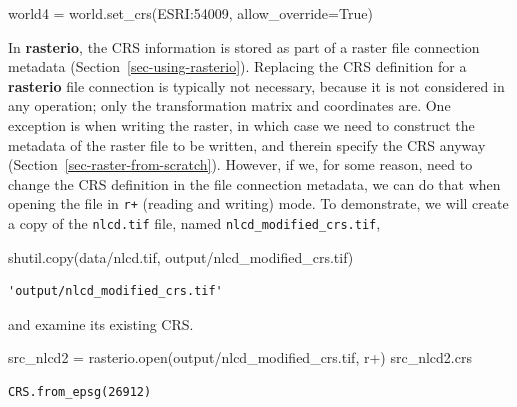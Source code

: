 \documentclass[
  letterpaper,
]{krantz}
\newenvironment{Shaded}{\begin{snugshade}}{\end{snugshade}}
\newcommand{\BuiltInTok}[1]{\textcolor[rgb]{0.00,0.23,0.31}{#1}}
\newcommand{\NormalTok}[1]{\textcolor[rgb]{0.00,0.23,0.31}{#1}}
\newcommand{\OperatorTok}[1]{\textcolor[rgb]{0.37,0.37,0.37}{#1}}
\newcommand{\StringTok}[1]{\textcolor[rgb]{0.13,0.47,0.30}{#1}}
\newcommand{\VariableTok}[1]{\textcolor[rgb]{0.07,0.07,0.07}{#1}}
\begin{document}
\begin{Shaded}
\begin{Highlighting}[]
\NormalTok{world4 }\OperatorTok{=}\NormalTok{ world.set\_crs(}\StringTok{\textquotesingle{}ESRI:54009\textquotesingle{}}\NormalTok{, allow\_override}\OperatorTok{=}\VariableTok{True}\NormalTok{)}
\end{Highlighting}
\end{Shaded}

In \textbf{rasterio}, the CRS information is stored as part of a raster
file connection metadata (Section~\ref{sec-using-rasterio}). Replacing
the CRS definition for a \textbf{rasterio} file connection is typically
not necessary, because it is not considered in any operation; only the
transformation matrix and coordinates are. One exception is when writing
the raster, in which case we need to construct the metadata of the
raster file to be written, and therein specify the CRS anyway
(Section~\ref{sec-raster-from-scratch}). However, if we, for some
reason, need to change the CRS definition in the file connection
metadata, we can do that when opening the file in \texttt{r+} (reading
and writing) mode. To demonstrate, we will create a copy of the
\texttt{nlcd.tif} file, named \texttt{nlcd\_modified\_crs.tif},

\begin{Shaded}
\begin{Highlighting}[]
\NormalTok{shutil.copy(}\StringTok{\textquotesingle{}data/nlcd.tif\textquotesingle{}}\NormalTok{, }\StringTok{\textquotesingle{}output/nlcd\_modified\_crs.tif\textquotesingle{}}\NormalTok{)}
\end{Highlighting}
\end{Shaded}

\begin{verbatim}
'output/nlcd_modified_crs.tif'
\end{verbatim}

and examine its existing CRS.

\begin{Shaded}
\begin{Highlighting}[]
\NormalTok{src\_nlcd2 }\OperatorTok{=}\NormalTok{ rasterio.}\BuiltInTok{open}\NormalTok{(}\StringTok{\textquotesingle{}output/nlcd\_modified\_crs.tif\textquotesingle{}}\NormalTok{, }\StringTok{\textquotesingle{}r+\textquotesingle{}}\NormalTok{)}
\NormalTok{src\_nlcd2.crs}
\end{Highlighting}
\end{Shaded}

\begin{verbatim}
CRS.from_epsg(26912)
\end{verbatim}
\end{document}
